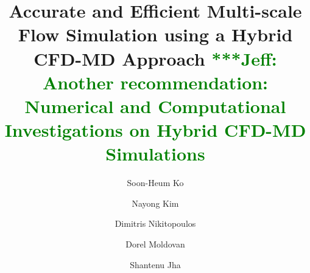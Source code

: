 \documentclass[preprint,12pt]{elsarticle}
\newcommand{\skonote}[1]{ {\textcolor{green} { ***Jeff: #1 }}}
\newcommand{\skonote}[1]{}
\begin{document}
\begin{frontmatter}



\title{Accurate and Efficient Multi-scale Flow Simulation using a Hybrid CFD-MD Approach\skonote{Another recommendation: Numerical and Computational Investigations on Hybrid CFD-MD Simulations}}

\author[add0,add1]{Soon-Heum Ko}
\author[add1]{Nayong Kim}
\author[add3]{Dimitris Nikitopoulos}
\author[add3]{Dorel Moldovan}
\author[add1,add2]{Shantenu Jha}
\address[add1]{Center for Computation \& Technology, Louisiana State University, Baton Rouge, LA 70803, USA}
\address[add0]{National Supercomputing Centre, Link\"{o}ping University, Link\"{o}ping, SE-581 83, Sweden}
\address[add2]{Department of Computer Science, Louisiana State University, Baton Rouge, LA 70803, USA}
\address[add3]{Department of Mechanical Engineering, Louisiana State University, Baton Rouge, LA 70803, USA}


\end{frontmatter}
\end{document}
